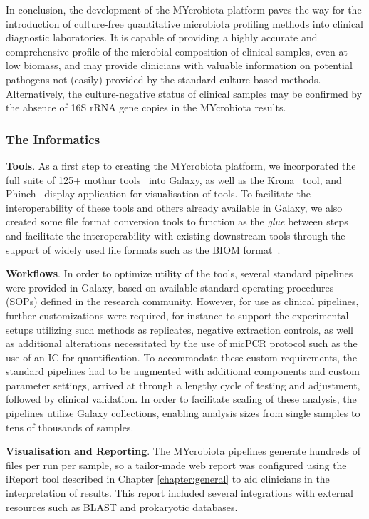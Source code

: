 In conclusion, the development of the MYcrobiota platform paves the way for the introduction of culture-free quantitative microbiota profiling methods into clinical diagnostic laboratories. It is capable of providing a highly accurate and comprehensive profile of the microbial composition of clinical samples, even at low biomass, and may provide clinicians with valuable information on potential pathogens not (easily) provided by the standard culture-based methods. Alternatively, the culture-negative status of clinical samples may be confirmed by the absence of 16S rRNA gene copies in the MYcrobiota results.

\subsubsection{The Informatics}

\textbf{Tools}. As a first step to creating the MYcrobiota platform, we incorporated the full suite of 125+ mothur tools~\cite{schloss} into Galaxy, as well as the Krona~\cite{ondov2015krona} tool, and Phinch~\cite{bik2014phinch} display application for visualisation of tools. To facilitate the interoperability of these tools and others already available in Galaxy, we also created some file format conversion tools to function as the \emph{glue} between steps and facilitate the interoperability with existing downstream tools through the support of widely used file formats such as the BIOM format~\cite{mcdonald2012biological}.


\textbf{Workflows}. In order to optimize utility of the tools, several standard pipelines were provided in Galaxy, based on available standard operating procedures (SOPs) defined in the research community. However, for use as clinical pipelines, further customizations were required, for instance to support the experimental setups utilizing such methods as replicates, negative extraction controls, as well as additional alterations necessitated by the use of micPCR protocol such as the use of an IC for quantification. To accommodate these custom requirements, the standard pipelines had to be augmented with additional components and custom parameter settings, arrived at through a lengthy cycle of testing and adjustment, followed by clinical validation. In order to facilitate scaling of these analysis, the pipelines utilize Galaxy collections, enabling analysis sizes from single samples to tens of thousands of samples.

\textbf{Visualisation and Reporting}. The MYcrobiota pipelines generate hundreds of files per run per sample, so a tailor-made web report was configured using the iReport tool described in Chapter \ref{chapter:general} to aid clinicians in the interpretation of results. This report included several integrations with external resources such as BLAST and prokaryotic databases.

